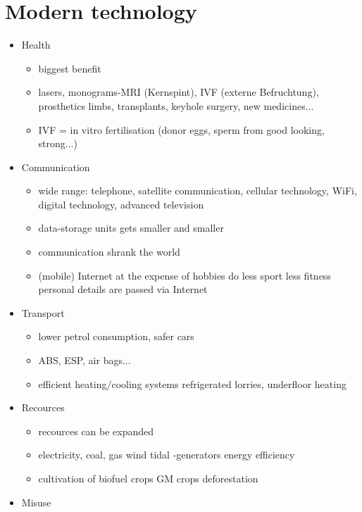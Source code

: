 \documentclass[a5paper,12pt,twoside,titlepage]{scrartcl}
\begin{document}
\section{Modern technology}
	\begin{itemize}
	\item Health
		\begin{itemize}
			\item biggest benefit
			\item lasers, monograms-MRI (Kernspint), IVF (externe Befruchtung), prosthetics limbs, transplants, keyhole surgery, new medicines... 
			\item IVF = in vitro fertilisation (\textrightarrow donor eggs, sperm from good looking, strong...)
		\end{itemize}
	\item Communication
		\begin{itemize}
			\item wide range: telephone, satellite communication, cellular technology, WiFi, digital technology, advanced television
			\item data-storage units gets smaller and smaller
			\item communication shrank the world
			\item (mobile) Internet at the expense of hobbies \textrightarrow do less sport \textrightarrow less fitness \textrightarrow personal details are passed via Internet
		\end{itemize}
	\item Transport
		\begin{itemize}
			\item lower petrol consumption, safer cars
			\item ABS, ESP, air bags...
			\item efficient heating/cooling systems \textrightarrow refrigerated lorries, underfloor heating
		\end{itemize}
	\item Recources
		\begin{itemize}
				\item recources can be expanded
				\item electricity, coal, gas \textrightarrow wind tidal -generators \textrightarrow energy efficiency
				\item cultivation of biofuel crops \textrightarrow GM crops \textrightarrow deforestation
		\end{itemize}
	\item Misuse
		\begin{itemize}

\end{itemize}
\end{itemize}
\end{document}
